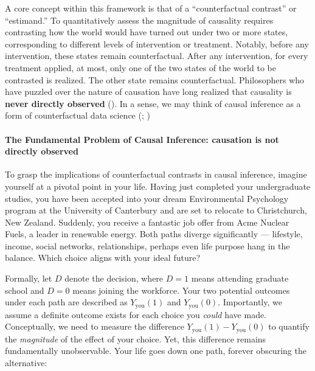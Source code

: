 \documentclass[
  singlecolumn]{article}
\let\oldparagraph\paragraph
\renewcommand{\paragraph}[1]{\oldparagraph{#1}\mbox{}}
\begin{document}
A core concept within this framework is that of a ``counterfactual
contrast'' or ``estimand.'' To quantitatively assess the magnitude of
causality requires contrasting how the world would have turned out under
two or more states, corresponding to different levels of intervention or
treatment. Notably, before any intervention, these states remain
counterfactual. After any intervention, for every treatment applied, at
most, only one of the two states of the world to be contrasted is
realized. The other state remains counterfactual. Philosophers who have
puzzled over the nature of causation have long realized that causality
is \textbf{never directly observed} (). In a sense, we may think of causal inference as a form of
counterfactual data science (; )

\paragraph{The Fundamental Problem of Causal Inference: causation is not
directly
observed}\label{the-fundamental-problem-of-causal-inference-causation-is-not-directly-observed}

To grasp the implications of counterfactual contrasts in causal
inference, imagine yourself at a pivotal point in your life. Having just
completed your undergraduate studies, you have been accepted into your
dream Environmental Psychology program at the University of Canterbury
and are set to relocate to Christchurch, New Zealand. Suddenly, you
receive a fantastic job offer from Acme Nuclear Fuels, a leader in
renewable energy. Both paths diverge significantly --- lifestyle,
income, social networks, relationships, perhaps even life purpose hang
in the balance. Which choice aligns with your ideal future?

Formally, let \(D\) denote the decision, where \(D = 1\) means attending
graduate school and \(D = 0\) means joining the workforce. Your two
potential outcomes under each path are described as
\(Y_{\text{you}}(1)\) and \(Y_{\text{you}}(0)\). Importantly, we assume
a definite outcome exists for each choice you \emph{could} have made.
Conceptually, we need to measure the difference
\(Y_{\text{you}}(1) - Y_{\text{you}}(0)\) to quantify the
\emph{magnitude} of the effect of your choice. Yet, this difference
remains fundamentally unobservable. Your life goes down one path,
forever obscuring the alternative:
\end{document}

